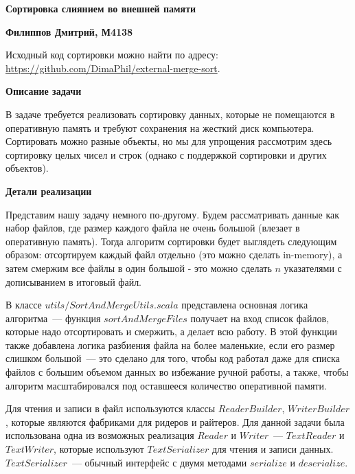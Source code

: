 \documentclass[11pt,a4paper,oneside]{article}
\begin{document}
\renewcommand{\t}[1]{\mbox{\texttt{#1}}}
\newcommand{\s}[1]{\mbox{``\t{#1}''}}
\newcommand{\eps}{\varepsilon}
\renewcommand{\phi}{\varphi}
\newcommand{\plainhat}{{\char 94}}

\newcommand{\Z}{\mathbb{Z}}
\newcommand{\w}[1]{``\t{#1}''}





\textbf{Сортировка слиянием во внешней памяти}

\textbf{Филиппов Дмитрий, М4138}

Исходный код сортировки можно найти по адресу: \url{https://github.com/DimaPhil/external-merge-sort}.

\textbf{Описание задачи}

В задаче требуется реализовать сортировку данных, которые не помещаются в оперативную память и требуют сохранения на жесткий диск компьютера.
Сортировать можно разные объекты, но мы для упрощения рассмотрим здесь сортировку целых чисел и строк (однако с поддержкой сортировки и других объектов).

\textbf{Детали реализации}

Представим нашу задачу немного по-другому. Будем рассматривать данные как набор файлов, где размер каждого файла не очень большой (влезает в оперативную память). Тогда алгоритм сортировки будет выглядеть следующим образом: отсортируем каждый файл отдельно (это можно сделать in-memory), а затем смержим все файлы в один большой - это можно сделать $n$ указателями с дописыванием в итоговый файл.

В классе $utils/SortAndMergeUtils.scala$ представлена основная логика алгоритма~--- функция $sortAndMergeFiles$ получает на вход список файлов, которые надо отсортировать и смержить, а делает всю работу. В этой функции также добавлена логика разбиения файла на более маленькие, если его размер слишком большой~--- это сделано для того, чтобы код работал даже для списка файлов с большим объемом данных во избежание ручной работы, а также, чтобы алгоритм масштабировался под оставшееся количество оперативной памяти.

Для чтения и записи в файл используются классы $ReaderBuilder$, $WriterBuilder$, которые являются фабриками для ридеров и райтеров. Для данной задачи была использована одна из возможных реализация $Reader$ и $Writer$~--- $TextReader$ и $TextWriter$, которые используют $TextSerializer$ для чтения и записи данных. $TextSerializer$~--- обычный интерфейс с двумя методами $serialize$ и $deserialize$.
\end{document}
